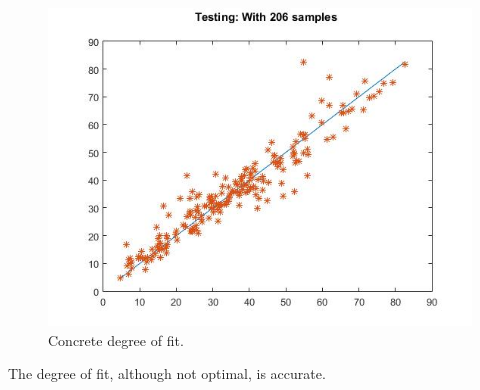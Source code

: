 \documentclass{article}%
\begin{document}
\begin{figure}[H]
\centering
\includegraphics[scale=0.5]{Concrete/test.jpg}
\caption{Concrete degree of fit.}
\label{fig:conreg}
\end{figure}
The degree of fit, although not optimal, is accurate.

\end{document}
